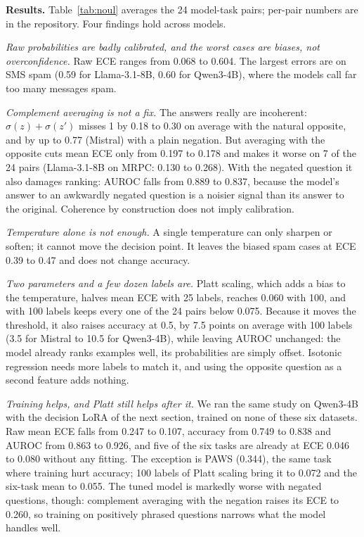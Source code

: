 \documentclass[10pt,twocolumn]{article}
\begin{document}
\textbf{Results.} Table~\ref{tab:noul} averages the 24 model-task pairs; per-pair numbers are in the repository.
Four findings hold across models.

\emph{Raw probabilities are badly calibrated, and the worst cases are biases, not overconfidence.} Raw ECE ranges
from 0.068 to 0.604. The largest errors are on SMS spam (0.59 for Llama-3.1-8B, 0.60 for Qwen3-4B), where the models
call far too many messages spam.

\emph{Complement averaging is not a fix.} The answers really are incoherent: $\sigma(z) + \sigma(z')$ misses 1 by
0.18 to 0.30 on average with the natural opposite, and by up to 0.77 (Mistral) with a plain negation. But averaging
with the opposite cuts mean ECE only from 0.197 to 0.178 and makes it worse on 7 of the 24 pairs (Llama-3.1-8B on
MRPC: 0.130 to 0.268). With the negated question it also damages ranking: AUROC falls from 0.889 to 0.837, because
the model's answer to an awkwardly negated question is a noisier signal than its answer to the original. Coherence by
construction does not imply calibration.

\emph{Temperature alone is not enough.} A single temperature can only sharpen or soften; it cannot move the decision
point. It leaves the biased spam cases at ECE 0.39 to 0.47 and does not change accuracy.

\emph{Two parameters and a few dozen labels are.} Platt scaling, which adds a bias to the temperature, halves mean
ECE with 25 labels, reaches 0.060 with 100, and with 100 labels keeps every one of the 24 pairs below 0.075. Because
it moves the threshold, it also raises accuracy at 0.5, by 7.5 points on average with 100 labels (3.5 for Mistral to 10.5 for Qwen3-4B), while
leaving AUROC unchanged: the model
already ranks examples well, its probabilities are simply offset. Isotonic regression needs more labels to match it,
and using the opposite question as a second feature adds nothing.

\emph{Training helps, and Platt still helps after it.} We ran the same study on Qwen3-4B with the decision LoRA of the
next section, trained on none of these six datasets. Raw mean ECE falls from 0.247 to 0.107, accuracy from 0.749 to
0.838 and AUROC from 0.863 to 0.926, and five of the six tasks are already at ECE 0.046 to 0.080 without any fitting.
The exception is PAWS (0.344), the same task where training hurt accuracy; 100 labels of Platt scaling bring it to
0.072 and the six-task mean to 0.055. The tuned model is markedly worse with negated questions, though: complement
averaging with the negation raises its ECE to 0.260, so training on positively phrased questions narrows what the
model handles well.
\end{document}
